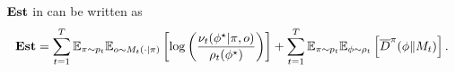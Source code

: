 \begin{lemma}\label{lem: general est bound lemm}
    $\textbf{\textup{Est}}$ in  can be written as 
    \begin{align}
        \textbf{\textup{Est}} = \sum_{t=1}^T \mathbb{E}_{\pi \sim p_t}\mathbb{E}_{o \sim M_t(\cdot|\pi)}\left[\log\left(\frac{\nu_t(\phi^\star|\pi, o)}{\rho_t(\phi^\star)}\right)\right] +  \sum_{t=1}^T\mathbb{E}_{\pi \sim p_t}\mathbb{E}_{\phi\sim \rho_t}\left[\overline{D}^{\pi}(\phi\|M_t)\right].    \label{eq: est in batch}
    \end{align}
\end{lemma}
